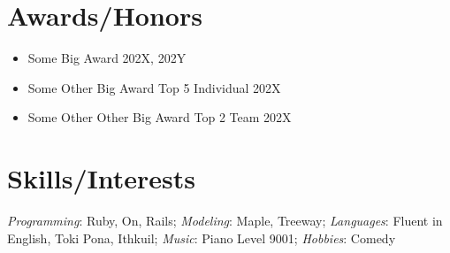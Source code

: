 \documentclass[10pt]{article}
\begin{document}
\section{Awards/Honors}
\begin{itemize}
    \item Some Big Award 202X, 202Y
    \item Some Other Big Award Top 5 Individual 202X
    \item Some Other Other Big Award Top 2 Team 202X
\end{itemize}

\section{Skills/Interests}
\emph{Programming}: Ruby, On, Rails; \emph{Modeling}: Maple, Treeway; \emph{Languages}: Fluent in English, Toki Pona, Ithkuil; \emph{Music}: Piano Level 9001; \emph{Hobbies}: Comedy
\end{document}
